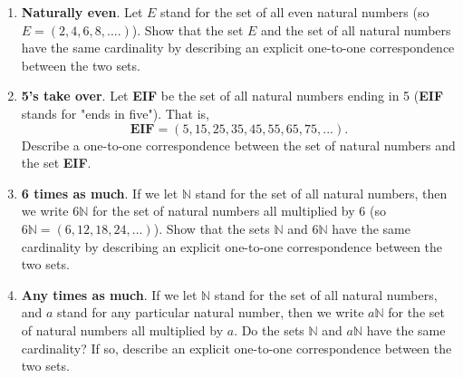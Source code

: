 \begin{enumerate}

\item \textbf{Naturally even}. Let $E$ stand for the set of all even natural numbers (so $E = (2, 4, 6, 8, .... )$). Show that the set $E$ and the set of all natural numbers have the same cardinality by describing an explicit one-to-one correspondence between the two sets.
\vfill 

\item \textbf{5's take over}. Let \textbf{EIF} be the set of all natural numbers ending in 5 (\textbf{EIF} stands for "ends in five"). That is,
\[\mathbf{EIF} = (5, 15, 25, 35, 45, 55, 65, 75, . . . ).\]
Describe a one-to-one correspondence between the set of natural numbers and the set \textbf{EIF}.
\vfill 

\item \textbf{6 times as much}. If we let $\mathbb{N}$ stand for the set of all natural numbers, then we write $6\mathbb{N}$ for the set of natural numbers all multiplied by 6 (so $6\mathbb{N} = (6, 12, 18, 24, . .. )$). Show that the sets $\mathbb{N}$ and $6\mathbb{N}$ have the same cardinality by describing an explicit one-to-one correspondence between the two sets.
\vfill 

\item \textbf{Any times as much}. If we let $\mathbb{N}$ stand for the set of all natural numbers, and $a$ stand for any particular natural number, then we write $a\mathbb{N}$ for the set of natural numbers all multiplied by $a$. Do the sets $\mathbb{N}$ and $a\mathbb{N}$ have the same cardinality? If so, describe an explicit one-to-one correspondence between the two sets.
\vfill 

%
%


\end{enumerate}
